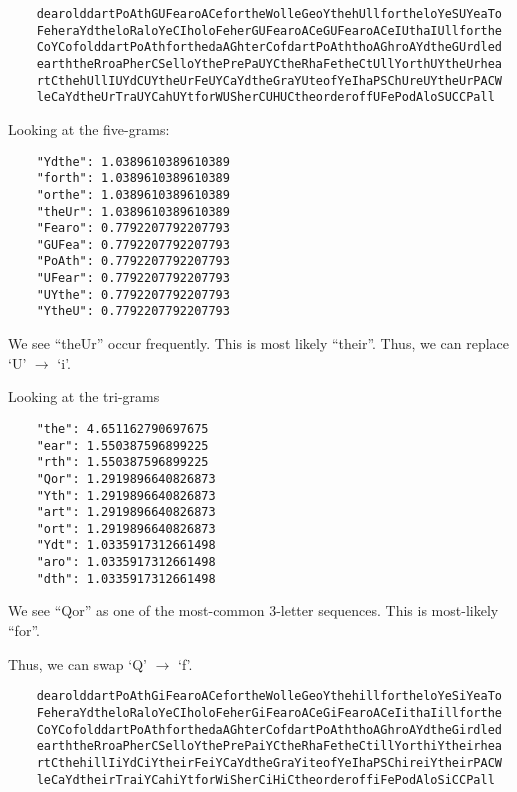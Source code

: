 \begin{Answer}
  \begin{Verbatim}
    dearolddartPoAthGUFearoACefortheWolleGeoYthehUllfortheloYeSUYeaTo
    FeheraYdtheloRaloYeCIholoFeherGUFearoACeGUFearoACeIUthaIUllforthe
    CoYCofolddartPoAthforthedaAGhterCofdartPoAththoAGhroAYdtheGUrdled
    earththeRroaPherCSelloYthePrePaUYCtheRhaFetheCtUllYorthUYtheUrhea
    rtCthehUllIUYdCUYtheUrFeUYCaYdtheGraYUteofYeIhaPSChUreUYtheUrPACW
    leCaYdtheUrTraUYCahUYtforWUSherCUHUCtheorderoffUFePodAloSUCCPall
  \end{Verbatim}

  \noindent
  Looking at the five-grams:

  \begin{Verbatim}
    "Ydthe": 1.0389610389610389
    "forth": 1.0389610389610389
    "orthe": 1.0389610389610389
    "theUr": 1.0389610389610389
    "Fearo": 0.7792207792207793
    "GUFea": 0.7792207792207793
    "PoAth": 0.7792207792207793
    "UFear": 0.7792207792207793
    "UYthe": 0.7792207792207793
    "YtheU": 0.7792207792207793
  \end{Verbatim}

  \noindent
  We see ``theUr'' occur frequently. This is most likely ``their''.
  Thus, we can replace `U' $\rightarrow$ `i'.

  \noindent
  Looking at the tri-grams

  \begin{Verbatim}
    "the": 4.651162790697675
    "ear": 1.550387596899225
    "rth": 1.550387596899225
    "Qor": 1.2919896640826873
    "Yth": 1.2919896640826873
    "art": 1.2919896640826873
    "ort": 1.2919896640826873
    "Ydt": 1.0335917312661498
    "aro": 1.0335917312661498
    "dth": 1.0335917312661498
  \end{Verbatim}

  We see ``Qor'' as one of the most-common 3-letter sequences.
  This is most-likely ``for''.

  \noindent
  Thus, we can swap `Q' $\rightarrow$ `f'.

  \begin{Verbatim}
    dearolddartPoAthGiFearoACefortheWolleGeoYthehillfortheloYeSiYeaTo
    FeheraYdtheloRaloYeCIholoFeherGiFearoACeGiFearoACeIithaIillforthe
    CoYCofolddartPoAthforthedaAGhterCofdartPoAththoAGhroAYdtheGirdled
    earththeRroaPherCSelloYthePrePaiYCtheRhaFetheCtillYorthiYtheirhea
    rtCthehillIiYdCiYtheirFeiYCaYdtheGraYiteofYeIhaPSChireiYtheirPACW
    leCaYdtheirTraiYCahiYtforWiSherCiHiCtheorderoffiFePodAloSiCCPall
  \end{Verbatim}


\end{Answer}
